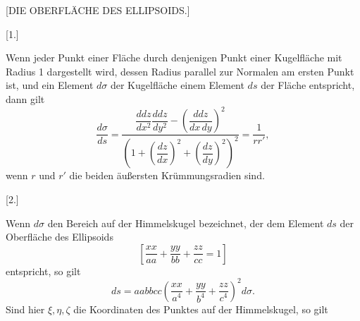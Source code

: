 \clearpage
{}%
\begin{center}{\large [DIE OBERFLÄCHE DES ELLIPSOIDS.]\par}\end{center}
\begin{center}[1.]\end{center}

Wenn jeder Punkt einer Fläche durch denjenigen Punkt einer Kugelfläche mit Radius 1 dargestellt wird, dessen Radius parallel zur Normalen am ersten Punkt ist, und ein Element $d\sigma$ der Kugelfläche einem Element $ds$ der Fläche entspricht, dann gilt
\[
\frac{d\sigma}{ds}=\frac{\dfrac{ddz}{dx^2}\dfrac{ddz}{dy^2}-\left(\dfrac{ddz}{dx\,dy}\right)^2}{\left(1+\left(\dfrac{dz}{dx}\right)^2+\left(\dfrac{dz}{dy}\right)^2\right)^2}=\frac1{rr'},
\]
wenn $r$ und $r'$ die beiden äußersten Krümmungsradien sind.
\begin{center}[2.]\end{center}

Wenn $d\sigma$ den Bereich auf der Himmelskugel bezeichnet, der dem Element $ds$ der Oberfläche des Ellipsoids
\[
\left[\frac{xx}{aa}+\frac{yy}{bb}+\frac{zz}{cc}=1\right]
\]
entspricht, so gilt
\[
ds=aabbcc\left(\frac{xx}{a^4}+\frac{yy}{b^4}+\frac{zz}{c^4}\right)^2d\sigma.
\]
Sind hier $\xi,\eta,\zeta$ die Koordinaten des Punktes auf der Himmelskugel, so gilt
